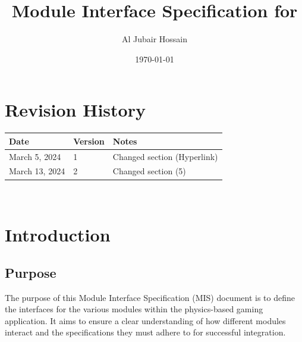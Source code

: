 \documentclass[12pt, titlepage]{article}
\begin{document}
\title{Module Interface Specification for }

\author{Al Jubair Hossain}

\date{\today}

\maketitle


\section{Revision History}

\begin{tabularx}{\textwidth}{p{3cm}p{2cm}X}
\toprule {\bf Date} & {\bf Version} & {\bf Notes}\\
\midrule
March 5, 2024 & 1 & Changed section (Hyperlink) \\
March 13, 2024 & 2 & Changed section (5)\\
\bottomrule
\end{tabularx}

~\newpage





\tableofcontents

\newpage


\section{Introduction}

\subsection{Purpose}
The purpose of this Module Interface Specification (MIS) document is to define the interfaces for the various modules within the physics-based gaming application. It aims to ensure a clear understanding of how different modules interact and the specifications they must adhere to for successful integration.
\end{document}
